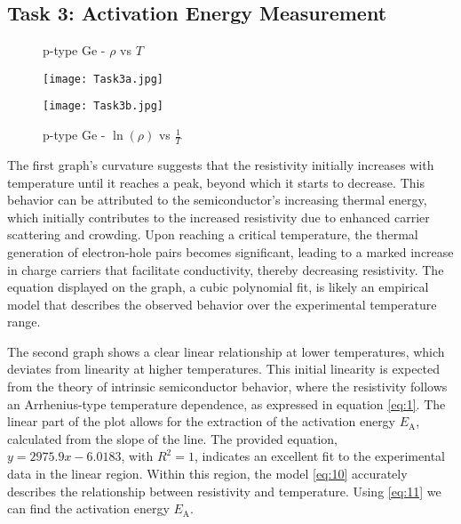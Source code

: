 \documentclass[11pt]{article}
\begin{document}
\clearpage

	\subsection{Task 3: Activation Energy Measurement}
	
		\begin{figure}[h!]
		\centering
		\begin{minipage}{0.45\textwidth}
			\centering
			\caption{p-type Ge - $\rho$ vs $T$}
			\texttt{[image: Task3a.jpg]}
			\label{fig:image6}
		\end{minipage}\hfill
		\begin{minipage}{0.45\textwidth}
			\centering
			\caption{p-type Ge - $\ln(\rho)$ vs $\frac{1}{T}$}
			\texttt{[image: Task3b.jpg]}
			\label{fig:image7}
		\end{minipage}
	\end{figure}
	
	The first graph’s curvature suggests that the resistivity initially increases with temperature until it reaches a peak, beyond which it starts to decrease. This behavior can be attributed to the semiconductor's increasing thermal energy, which initially contributes to the increased resistivity due to enhanced carrier scattering and crowding. Upon reaching a critical temperature, the thermal generation of electron-hole pairs becomes significant, leading to a marked increase in charge carriers that facilitate conductivity, thereby decreasing resistivity. The equation displayed on the graph, a cubic polynomial fit, is likely an empirical model that describes the observed behavior over the experimental temperature range. 
	
	The second graph shows a clear linear relationship at lower temperatures, which deviates from linearity at higher temperatures. This initial linearity is expected from the theory of intrinsic semiconductor behavior, where the resistivity follows an Arrhenius-type temperature dependence, as expressed in equation \ref{eq:1}. The linear part of the plot allows for the extraction of the activation energy \( E_\mathrm{A} \), calculated from the slope of the line. The provided equation, \( y = 2975.9x - 6.0183 \), with \( R^2 = 1 \), indicates an excellent fit to the experimental data in the linear region. Within this region, the model \ref{eq:10} accurately describes the relationship between resistivity and temperature. Using \ref{eq:11} we can find the activation energy $E_\mathrm{A}$.
	
\end{document}
